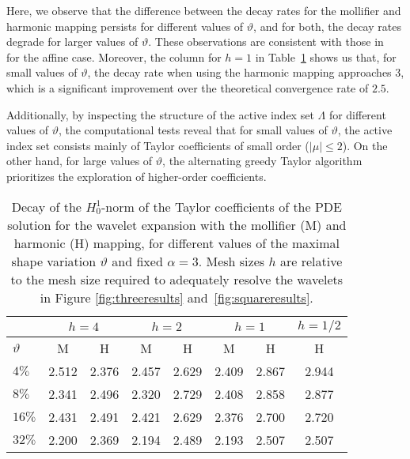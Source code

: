 Here, we observe that the difference between the decay rates for the mollifier and harmonic mapping persists for different values of $\vartheta$, and for both, the decay rates degrade for larger values of $\vartheta$.
These observations are consistent with those in~\cite{bachmayr2017a} for the affine case.
Moreover, the column for $h=1$ in Table~\ref{tab:shapevar} shows us that, for small values of $\vartheta$, the decay rate when using the harmonic mapping approaches $3$, which is a significant improvement over the theoretical convergence rate of $2.5$.

Additionally, by inspecting the structure of the active index set $\Lambda$ for different values of $\vartheta$, the computational tests reveal that for small values of $\vartheta$, the active index set consists mainly of Taylor coefficients of small order ($|\mu|\leq 2$).
On the other hand, for large values of $\vartheta$, the alternating greedy Taylor algorithm prioritizes the exploration of higher-order coefficients.

\begin{table}
	\centering
	\begin{tabular}{l|cc|cc|cc|c}
		& \multicolumn{2}{c|}{$h=4$}             & \multicolumn{2}{c|}{$h=2$}   & \multicolumn{2}{c|}{$h=1$}                  & $h=1/2$        \\ \hline
		$\vartheta$  & \multicolumn{1}{c|}{M}     & H       & \multicolumn{1}{c|}{M}           & H       & \multicolumn{1}{c|}{M}     &H       & H                  \\ \hline
		$4\%$        & \multicolumn{1}{l|}{2.512}  & 2.376    & \multicolumn{1}{l|}{2.457}     & 2.629    & \multicolumn{1}{l|}{2.409}  & 2.867   & 2.944               \\
		$8\%$        & \multicolumn{1}{l|}{2.341}  & 2.496    & \multicolumn{1}{l|}{2.320}     & 2.729    & \multicolumn{1}{l|}{2.408}  & 2.858   & 2.877                   \\
		$16\%$       & \multicolumn{1}{l|}{2.431}  & 2.491    & \multicolumn{1}{l|}{2.421}     & 2.629    & \multicolumn{1}{l|}{2.376}  & 2.700   & 2.720               \\
		$32\%$       & \multicolumn{1}{l|}{2.200}  & 2.369    & \multicolumn{1}{l|}{2.194}     & 2.489    & \multicolumn{1}{l|}{2.193}  & 2.507   & 2.507
	\end{tabular}

	\caption{Decay of the $H_0^1$-norm of the Taylor coefficients of the PDE solution for the wavelet expansion with the mollifier (M) and harmonic (H) mapping, for different values of the maximal shape variation $\vartheta$ and fixed $\alpha=3$. Mesh sizes $h$ are relative to the mesh size required to adequately resolve the wavelets in Figure \ref{fig:threeresults} and~\ref{fig:squareresults}.\reprintpermissionfootnote}
	\label{tab:shapevar}
\end{table}


